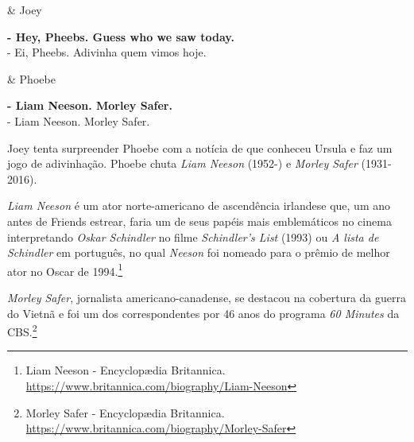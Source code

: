 \begin{tcolorbox}[enhanced,center upper,
    drop fuzzy shadow southeast, boxrule=0.3pt,
    lower separated=false, breakable,
    colframe=black!30!dialogoBorder,colback=white]
\begin{minipage}[c]{0.16\linewidth}
   & \centering \scriptsize{Joey}
\end{minipage}
\hfill
\begin{minipage}[c]{0.8\linewidth}
  \textbf{- Hey, Pheebs. Guess who we saw today.}\\
  - Ei, Pheebs. Adivinha quem vimos hoje.
\end{minipage}

\medskip
\begin{minipage}[c]{0.16\linewidth}
   & \centering \scriptsize{Phoebe}
\end{minipage}
\hfill
\begin{minipage}[c]{0.8\linewidth}
  \textbf{- Liam Neeson. Morley Safer.}\\
  - Liam Neeson. Morley Safer.
\end{minipage}
\end{tcolorbox}

Joey tenta surpreender Phoebe com a notícia de que conheceu Ursula e faz
um jogo de adivinhação. Phoebe chuta \emph{Liam Neeson} (1952-) e
\emph{Morley Safer} (1931-2016).

\emph{Liam Neeson} é um ator norte-americano de ascendência irlandese
que, um ano antes de Friends estrear, faria um de seus papéis mais
emblemáticos no cinema interpretando \emph{Oskar Schindler} no filme
\emph{Schindler's List} (1993) ou \emph{A lista de Schindler} em
português, no qual \emph{Neeson} foi nomeado para o prêmio de melhor
ator no Oscar de 1994.\footnote{\sloppy Liam Neeson - Encyclopædia Britannica. \url{https://www.britannica.com/biography/Liam-Neeson}}

\emph{Morley Safer}, jornalista americano-canadense, se destacou na
cobertura da guerra do Vietnã e foi um dos correspondentes por 46 anos
do programa \emph{60 Minutes} da CBS.\footnote{\sloppy Morley Safer - Encyclopædia Britannica. \url{https://www.britannica.com/biography/Morley-Safer}}

